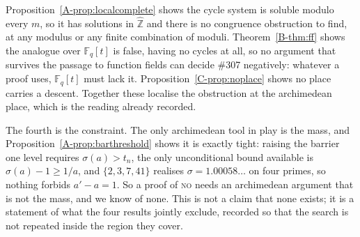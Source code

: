 \documentclass[11pt]{article}
\theoremstyle{definition}
\begin{document}
Proposition~\ref{A-prop:localcomplete} shows the cycle system is soluble modulo every $m$, so it has
solutions in $\widehat{\mathbb{Z}}$ and there is no congruence obstruction to find, at any modulus or
any finite combination of moduli. Theorem~\ref{B-thm:ff} shows the analogue over $\mathbb{F}_q[t]$ is
false, having no cycles at all, so no argument that survives the passage to function fields can
decide \#307 negatively: whatever a proof uses, $\mathbb{F}_q[t]$ must lack it.
Proposition~\ref{C-prop:noplace} shows no place carries a descent. Together these localise the
obstruction at the archimedean place, which is the reading already recorded.

The fourth is the constraint. The only archimedean tool in play is the mass, and
Proposition~\ref{A-prop:barthreshold} shows it is exactly tight: raising the barrier one level requires
$\sigma(a)>t_n$, the only unconditional bound available is $\sigma(a)-1\ge1/a$, and
$\{2,3,7,41\}$ realises $\sigma=1.00058\ldots$ on four primes, so nothing forbids $a'-a=1$. So a
proof of \textsc{no} needs an archimedean argument that is not the mass, and we know of none. This is
not a claim that none exists; it is a statement of what the four results jointly exclude, recorded so
that the search is not repeated inside the region they cover.
\end{document}
